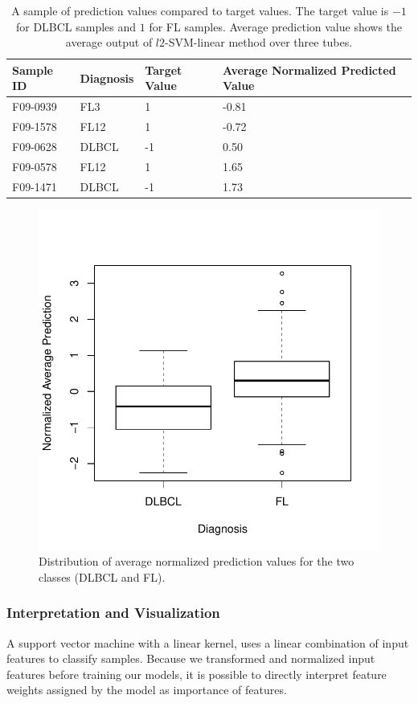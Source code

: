 \begin{table}[!ht]
  \centering
  \begin{tabular}{llll}
    Sample ID & Diagnosis & Target Value & Average Normalized Predicted Value \\ \hline
    F09-0939 & FL3 & 1 & -0.81 \\
    F09-1578 & FL12 & 1 & -0.72 \\
    F09-0628 & DLBCL & -1 & 0.50 \\
    F09-0578 & FL12 & 1 & 1.65 \\
    F09-1471 & DLBCL & -1 & 1.73
  \end{tabular}
  \caption{A sample of prediction values compared to target values. The target value is $-1$ for DLBCL samples and $1$ for FL samples. Average prediction value shows the average output of $l2$-SVM-linear method over three tubes.}
  \label{fig:fcs-qa-matchcount}
\end{table}

\begin{figure}[!ht]
  \centering
  \includegraphics[width=.6\textwidth]{figs/fcs-qa/predictions_boxplot}
  \caption{Distribution of average normalized prediction values for the two classes (DLBCL and FL).}
  \label{fig:fcs-qa-predictions-boxplot}
\end{figure}


\subsubsection{Interpretation and Visualization}
A support vector machine with a linear kernel, uses a linear combination of input features to classify samples. Because we transformed and normalized input features before training our models, it is possible to directly interpret feature weights assigned by the model as importance of features.

